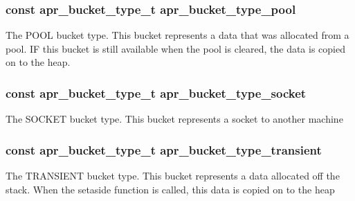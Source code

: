 \subsubsection[{\texorpdfstring{apr\+\_\+bucket\+\_\+type\+\_\+pool}{apr_bucket_type_pool}}]{ const {\bf apr\+\_\+bucket\+\_\+type\+\_\+t} apr\+\_\+bucket\+\_\+type\+\_\+pool}\hypertarget{group__APR__Util__Bucket__Brigades_gaa18a611f4fdb03f35ebc29fbfda55d2f}{}\label{group__APR__Util__Bucket__Brigades_gaa18a611f4fdb03f35ebc29fbfda55d2f}
The P\+O\+OL bucket type. This bucket represents a data that was allocated from a pool. IF this bucket is still available when the pool is cleared, the data is copied on to the heap. 
\subsubsection[{\texorpdfstring{apr\+\_\+bucket\+\_\+type\+\_\+socket}{apr_bucket_type_socket}}]{ const {\bf apr\+\_\+bucket\+\_\+type\+\_\+t} apr\+\_\+bucket\+\_\+type\+\_\+socket}\hypertarget{group__APR__Util__Bucket__Brigades_ga107a7f0eeb8834deae36c2a3acb6ddd0}{}\label{group__APR__Util__Bucket__Brigades_ga107a7f0eeb8834deae36c2a3acb6ddd0}
The S\+O\+C\+K\+ET bucket type. This bucket represents a socket to another machine 
\subsubsection[{\texorpdfstring{apr\+\_\+bucket\+\_\+type\+\_\+transient}{apr_bucket_type_transient}}]{ const {\bf apr\+\_\+bucket\+\_\+type\+\_\+t} apr\+\_\+bucket\+\_\+type\+\_\+transient}\hypertarget{group__APR__Util__Bucket__Brigades_ga0445b8ae0f59c8348b2b34dae23531f3}{}\label{group__APR__Util__Bucket__Brigades_ga0445b8ae0f59c8348b2b34dae23531f3}
The T\+R\+A\+N\+S\+I\+E\+NT bucket type. This bucket represents a data allocated off the stack. When the setaside function is called, this data is copied on to the heap 
